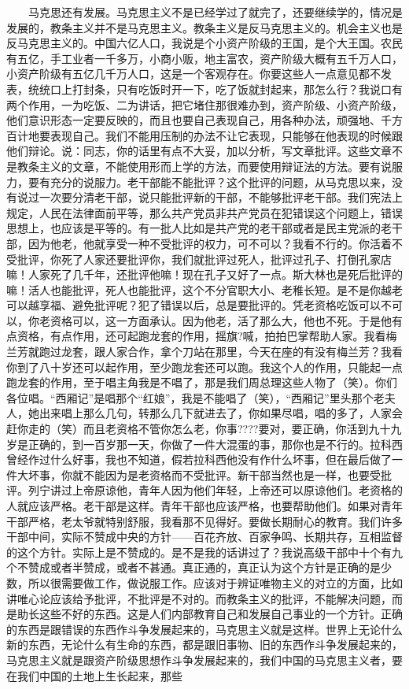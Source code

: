 \documentclass[cn,11pt,chinese]{elegantbook}
\begin{document}
　　马克思还有发展。马克思主义不是已经学过了就完了，还要继续学的，情况是发展的，教条主义并不是马克思主义。教条主义是反马克思主义的。机会主义也是反马克思主义的。中国六亿人口，我说是个小资产阶级的王国，是个大王国。农民有五亿，手工业者一千多万，小商小贩，地主富农，资产阶级大概有五千万人口，小资产阶级有五亿几千万人口，这是一个客观存在。你要这些人一点意见都不发表，统统口上打封条，只有吃饭时开一下，吃了饭就封起来，那怎么行？我说口有两个作用，一为吃饭、二为讲话，把它堵住那很难办到，资产阶级、小资产阶级，他们意识形态一定要反映的，而且也要自己表现自己，用各种办法，顽强地、千方百计地要表现自己。我们不能用压制的办法不让它表现，只能够在他表现的时候跟他们辩论。说：同志，你的话里有点不大妥，加以分析，写文章批评。这些文章不是教条主义的文章，不能使用形而上学的方法，而要使用辩证法的方法。要有说服力，要有充分的说服力。老干部能不能批评？这个批评的问题，从马克思以来，没有说过一次要分清老干部，说只能批评新的干部，不能够批评老干部。我们宪法上规定，人民在法律面前平等，那么共产党员非共产党员在犯错误这个问题上，错误思想上，也应该是平等的。有一批人比如是共产党的老干部或者是民主党派的老干部，因为他老，他就享受一种不受批评的权力，可不可以？我看不行的。你活着不受批评，你死了人家还要批评你，我们就批评过死人，批评过孔子、打倒孔家店嘛！人家死了几千年，还批评他嘛！现在孔子又好了一点。斯大林也是死后批评的嘛！活人也能批评，死人也能批评，这个不分官职大小、老稚长短。是不是你越老可以越享福、避免批评呢？犯了错误以后，总是要批评的。凭老资格吃饭可以不可以，你老资格可以，这一方面承认。因为他老，活了那么大，他也不死。于是他有点资格，有点作用，还可起跑龙套的作用，摇旗?喊，拍拍巴掌帮助人家。我看梅兰芳就跑过龙套，跟人家合作，拿个刀站在那里，今天在座的有没有梅兰芳？我看你到了八十岁还可以起作用，至少跑龙套还可以跑。我这个人的作用，只能起一点跑龙套的作用，至于唱主角我是不唱了，那是我们周总理这些人物了（笑）。你们各位唱。“西厢记”是唱那个“红娘”，我是不能唱了（笑），“西厢记”里头那个老夫人，她出来唱上那么几句，转那么几下就进去了，你如果尽唱，唱的多了，人家会赶你走的（笑）而且老资格不管你怎么老，你事????要对，要正确，你活到九十九岁是正确的，到一百岁那一天，你做了一件大混蛋的事，那你也是不行的。拉科西曾经作过什么好事，我也不知道，假若拉科西他没有作什么坏事，但在最后做了一件大坏事，你就不能因为是老资格而不受批评。新干部当然也是一样，也要受批评。列宁讲过上帝原谅他，青年人因为他们年轻，上帝还可以原谅他们。老资格的人就应该严格。老干部是这样。青年干部也应该严格，也要帮助他们。如果对青年干部严格，老太爷就特别舒服，我看那不见得好。要做长期耐心的教育。我们许多干部中间，实际不赞成中央的方针——百花齐放、百家争鸣、长期共存，互相监督的这个方针。实际上是不赞成的。是不是我的话讲过了？我说高级干部中十个有九个不赞成或者半赞成，或者不甚通。真正通的，真正认为这个方针是正确的是少数，所以很需要做工作，做说服工作。应该对于辨证唯物主义的对立的方面，比如讲唯心论应该给予批评，不批评是不对的。而教条主义的批评，不能解决问题，而是助长这些不好的东西。这是人们内部教育自己和发展自己事业的一个方针。正确的东西是跟错误的东西作斗争发展起来的，马克思主义就是这样。世界上无论什么新的东西，无论什么有生命的东西，都是跟旧事物、旧的东西作斗争发展起来的，马克思主义就是跟资产阶级思想作斗争发展起来的，我们中国的马克思主义者，要在我们中国的土地上生长起来，那些
\end{document}
